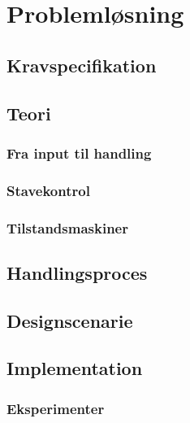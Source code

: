 \chapter{Problemløsning}


\section{Kravspecifikation}


\section{Teori}
\label{sec:teori}


\subsection{Fra input til handling}

\clearpage

\subsection{Stavekontrol}

\clearpage

\subsection{Tilstandsmaskiner}

\clearpage

\section{Handlingsproces}

\clearpage

\section{Designscenarie}




%

\clearpage

\section{Implementation}\label{sec:implementation}

\subsection{Eksperimenter}\label{sec:eksperimenter}
\clearpage

\clearpage
